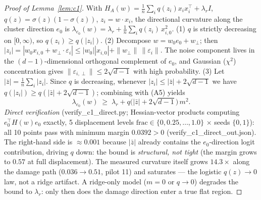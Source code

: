 \documentclass{article}
\newcommand{\lam}{\lambda}
\begin{document}
\begin{proof}[Proof of Lemma~\ref{lem:c1}]
With $H_A(w)=\frac1n\sum_i q(z_i)x_ix_i^\top+\lambda_r I$, $q(z)=\sigma(z)(1-\sigma(z))$,
$z_i=w\cdot x_i$, the directional curvature along the cluster direction $e_0$ is
$\lam_{e_0}(w)=\lambda_r+\frac1n\sum_i q(z_i)\,x_{i,0}^2$.
(1) $q$ is strictly decreasing on $[0,\infty)$, so $q(z_i)\ge q(|z_i|)$.
(2) Decompose $w=w_0e_0+w_\perp$; then
$|z_i|=|w_0x_{i,0}+w_\perp\cdot\varepsilon_i|\le|w_0||x_{i,0}|+\|w_\perp\|\,\|\varepsilon_i\|$.
The noise component lives in the $(d{-}1)$-dimensional orthogonal complement of $e_0$, and
Gaussian ($\chi^2$) concentration gives $\|\varepsilon_{i,\perp}\|\le2\sqrt{d-1}$ with high
probability.
(3) Let $|\bar z|=\frac1n\sum_i|z_i|$. Since $q$ is decreasing, whenever
$|z_i|\le|\bar z|+2\sqrt{d-1}$ we have $q(|z_i|)\ge q(|\bar z|+2\sqrt{d-1})$; combining with
(A5) yields
\begin{equation}
\lam_{e_0}(w)\;\ge\;\lambda_r+q\big(|\bar z|+2\sqrt{d-1}\big)\,m^2 .
\end{equation}
\emph{Direct verification} (verify\_c1\_direct.py; Hessian-vector products computing
$e_0^\top H(w)e_0$ exactly, 5 displacement levels $\mathrm{frac}\in\{0,0.25,\dots,1.0\}$
$\times$ seeds $\{0,1\}$): all 10 points pass with minimum margin $0.0392>0$
(verify\_c1\_direct\_out.json). The right-hand side is $\approx0.001$ because $|\bar z|$
already contains the $e_0$-direction logit contribution, driving $q$ down: the bound is
\emph{structural, not tight} (the margin grows to $0.57$ at full displacement). The measured
curvature itself grows $14.3\times$ along the damage path ($0.036\to0.51$, pilot 11) and
saturates --- the logistic $q(z)\to0$ law, not a ridge artifact. A ridge-only model ($m=0$ or
$q\to0$) degrades the bound to $\lambda_r$: only then does the damage direction enter a true
flat region.
\end{proof}
\end{document}
